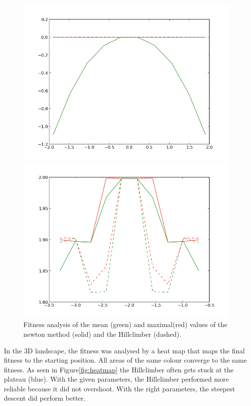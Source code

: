 \documentclass{scrartcl}
\begin{document}
\begin{figure}[H]
\centering
\begin{minipage}{.5\textwidth}
  \centering
  \includegraphics[width=.8\linewidth]{img/ex1/analysis_squared_newton_hill.png}
\end{minipage}%
\begin{minipage}{.5\textwidth}
  \centering
  \includegraphics[width=.8\linewidth]{img/ex1/analysis_trimodal_newton_hill.png}
\end{minipage}
\caption{Fitness analysis of the mean (green) and maximal(red) values of the newton method (solid) and the Hillclimber (dashed).}
\label{fig:2dminmax}
\end{figure}

In the 3D landscape, the fitness was analysed by a heat map that maps the final fitness to the starting position. All areas of the same colour converge to the same fitness. As seen in Figure\ref{fig:heatmap} the Hillclimber often gets stuck at the plateau (blue). With the given parameters, the Hillclimber performed more reliable because it did not overshoot. With the right parameters, the steepest descent did perform better.
 
\end{document}
